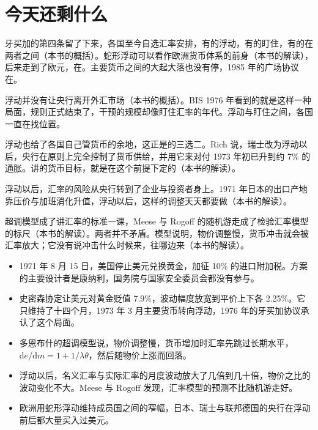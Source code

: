 \section{今天还剩什么}\label{sec:floating-legacy}

牙买加的第四条留了下来，各国至今自选汇率安排，有的浮动，有的盯住，有的在两者之间（本书的概括）。蛇形浮动可以看作欧洲货币体系的前身（本书的解读），后来走到了欧元，在。主要货币之间的大起大落也没有停，1985 年的广场协议在。

浮动并没有让央行离开外汇市场（本书的概括）。BIS 1976 年看到的就是这样一种局面，规则正式结束了，干预的规模却像盯住汇率的年代\cite{bis1976}。浮动与盯住之间，各国一直在找位置。

浮动也给了各国自己管货币的余地，这正是的三选二。Rich 说，瑞士改为浮动以后，央行在原则上完全控制了货币供给，并用它来对付 1973 年初已升到约 7\% 的通胀\cite{rich2003}。讲的货币目标，就是在这个前提下定的（本书的解读）。

浮动以后，汇率的风险从央行转到了企业与投资者身上。1971 年日本的出口产地靠压价与加班消化升值，浮动以后，这样的调整天天都要做（本书的解读）。

超调模型成了讲汇率的标准一课，Meese 与 Rogoff 的随机游走成了检验汇率模型的标尺（本书的解读）。两者并不矛盾。模型说明，物价调整慢，货币冲击就会被汇率放大；它没有说冲击什么时候来，往哪边来（本书的解读）。

\begin{takeaways}
\begin{itemize}
\item 1971 年 8 月 15 日，美国停止美元兑换黄金，加征 10\% 的进口附加税。方案的主要设计者是康纳利，国务院与国家安全委员会都没有参与。
\item 史密森协定让美元对黄金贬值 7.9\%，波动幅度放宽到平价上下各 2.25\%。它只维持了十四个月，1973 年 3 月主要货币转向浮动，1976 年的牙买加协议承认了这个局面。
\item 多恩布什的超调模型说，物价调整慢，货币增加时汇率先跳过长期水平，$\mathrm{d}e/\mathrm{d}m=1+1/\lambda\theta$，然后随物价上涨而回落。
\item 浮动以后，名义汇率与实际汇率的月度波动放大了几倍到几十倍，物价之比的波动变化不大。Meese 与 Rogoff 发现，汇率模型的预测不比随机游走好。
\item 欧洲用蛇形浮动维持成员国之间的窄幅，日本、瑞士与联邦德国的央行在浮动前后都大量买入过美元。
\end{itemize}
\end{takeaways}

